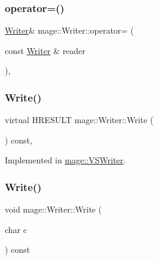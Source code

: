 \subsubsection{\texorpdfstring{operator=()}{operator=()}}
{\footnotesize\ttfamily \hyperlink{classmage_1_1_writer}{Writer}\& mage\+::\+Writer\+::operator= (\begin{DoxyParamCaption}\item[{const \hyperlink{classmage_1_1_writer}{Writer} \&}]{reader }\end{DoxyParamCaption})\hspace{0.3cm}{\ttfamily [private]}, {\ttfamily [delete]}}

\hypertarget{classmage_1_1_writer_a674375dbb233dea030603212d4090c18}{}\label{classmage_1_1_writer_a674375dbb233dea030603212d4090c18} 
\subsubsection{\texorpdfstring{Write()}{Write()}\hspace{0.1cm}{\footnotesize\ttfamily [1/3]}}
{\footnotesize\ttfamily virtual H\+R\+E\+S\+U\+LT mage\+::\+Writer\+::\+Write (\begin{DoxyParamCaption}{ }\end{DoxyParamCaption}) const\hspace{0.3cm}{\ttfamily [protected]}, {}}



Implemented in \hyperlink{classmage_1_1_v_s_writer_afda5e71bc0c5c836ab439e2572dcd685}{mage\+::\+V\+S\+Writer}.

\hypertarget{classmage_1_1_writer_aaa7908147290e06991ef18d5931e606b}{}\label{classmage_1_1_writer_aaa7908147290e06991ef18d5931e606b} 
\subsubsection{\texorpdfstring{Write()}{Write()}\hspace{0.1cm}{\footnotesize\ttfamily [2/3]}}
{\footnotesize\ttfamily void mage\+::\+Writer\+::\+Write (\begin{DoxyParamCaption}\item[{char}]{c }\end{DoxyParamCaption}) const\hspace{0.3cm}{\ttfamily [protected]}}


